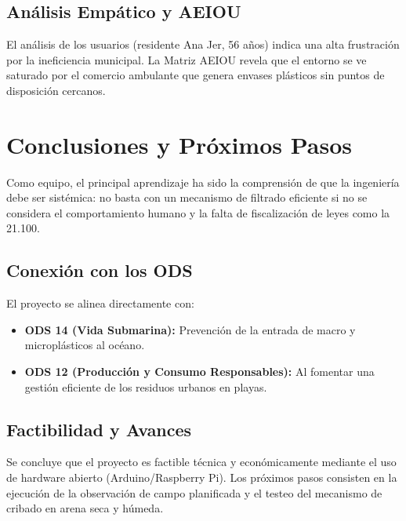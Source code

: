 \subsection{Análisis Empático y AEIOU}
El análisis de los usuarios (residente Ana Jer, 56 años) indica una alta frustración por la ineficiencia municipal. La Matriz AEIOU revela que el entorno se ve saturado por el comercio ambulante que genera envases plásticos sin puntos de disposición cercanos.

\newpage
\section{Conclusiones y Próximos Pasos}
Como equipo, el principal aprendizaje ha sido la comprensión de que la ingeniería debe ser sistémica: no basta con un mecanismo de filtrado eficiente si no se considera el comportamiento humano y la falta de fiscalización de leyes como la 21.100.

\subsection{Conexión con los ODS}
El proyecto se alinea directamente con:
\begin{itemize}
	\item \textbf{ODS 14 (Vida Submarina):} Prevención de la entrada de macro y microplásticos al océano.
	\item \textbf{ODS 12 (Producción y Consumo Responsables):} Al fomentar una gestión eficiente de los residuos urbanos en playas.
\end{itemize}

\subsection{Factibilidad y Avances}
Se concluye que el proyecto es factible técnica y económicamente mediante el uso de hardware abierto (Arduino/Raspberry Pi). Los próximos pasos consisten en la ejecución de la observación de campo planificada y el testeo del mecanismo de cribado en arena seca y húmeda.

\newpage
\nocite{*}
\insertindextitlepage{\namereferences}


